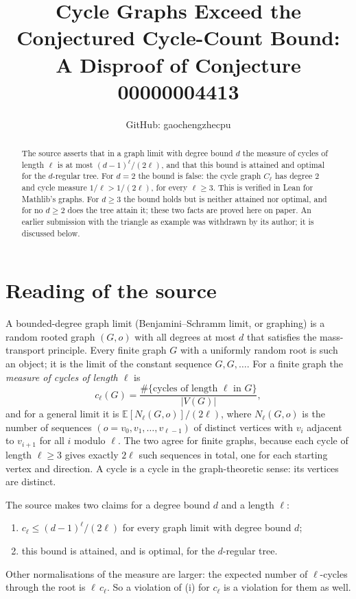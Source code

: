 \documentclass[11pt]{article}
\title{Cycle Graphs Exceed the Conjectured Cycle-Count Bound:\\
A Disproof of Conjecture 00000004413}
\author{GitHub: gaochengzhecpu}
\date{}
\theoremstyle{remark}
\begin{document}
\maketitle
\begin{abstract}
The source asserts that in a graph limit with degree bound $d$ the
measure of cycles of length $\ell$ is at most $(d-1)^\ell/(2\ell)$, and
that this bound is attained and optimal for the $d$-regular tree. For
$d=2$ the bound is false: the cycle graph $C_\ell$ has degree $2$ and
cycle measure $1/\ell>1/(2\ell)$, for every $\ell\ge3$. This is
verified in Lean for Mathlib's graphs. For $d\ge3$ the bound holds but
is neither attained nor optimal, and for no $d\ge2$ does the tree attain
it; these two facts are proved here on paper. An earlier submission
with the triangle as example was withdrawn by its author; it is
discussed below.
\end{abstract}

\section*{Reading of the source}
A bounded-degree graph limit (Benjamini--Schramm limit, or graphing)
is a random rooted graph $(G,o)$ with all degrees at most $d$ that
satisfies the mass-transport principle. Every finite graph $G$ with a
uniformly random root is such an object; it is the limit of the
constant sequence $G,G,\dots$. For a finite graph the \emph{measure of
cycles of length $\ell$} is
\[
 c_\ell(G)=\frac{\#\{\text{cycles of length }\ell\text{ in }G\}}{|V(G)|},
\]
and for a general limit it is $\mathbb E[N_\ell(G,o)]/(2\ell)$, where
$N_\ell(G,o)$ is the number of sequences
$(o=v_0,v_1,\dots,v_{\ell-1})$ of distinct vertices with $v_i$ adjacent
to $v_{i+1}$ for all $i$ modulo $\ell$. The two agree for finite
graphs, because each cycle of length $\ell\ge3$ gives exactly $2\ell$
such sequences in total, one for each starting vertex and direction.
A cycle is a cycle in the graph-theoretic sense: its vertices are
distinct.

The source makes two claims for a degree bound $d$ and a length
$\ell$:
\begin{enumerate}
\item[(i)] $c_\ell\le(d-1)^\ell/(2\ell)$ for every graph limit with
degree bound $d$;
\item[(ii)] this bound is attained, and is optimal, for the
$d$-regular tree.
\end{enumerate}
Other normalisations of the measure are larger: the expected number of
$\ell$-cycles through the root is $\ell\,c_\ell$. So a violation of (i)
for $c_\ell$ is a violation for them as well.
\end{document}
